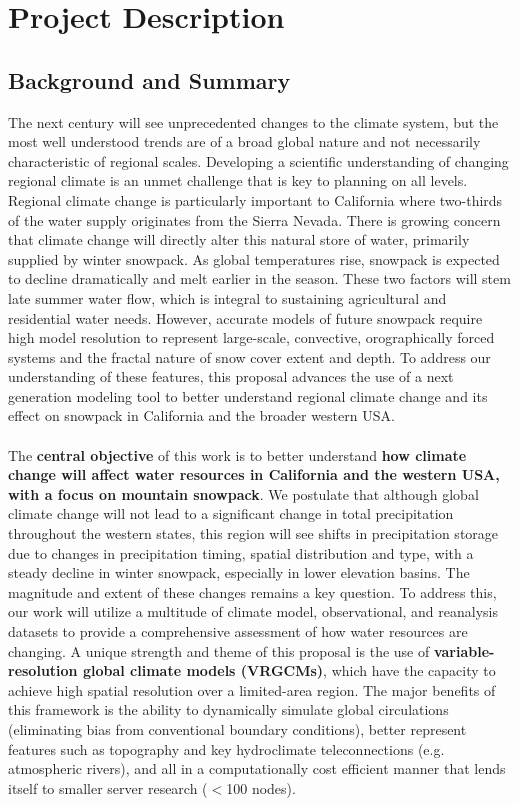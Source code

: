 \documentclass[11pt]{article}
\date{ }
\begin{document}


\section{Project Description}
\subsection{Background and Summary}
The next century will see unprecedented changes to the climate system, but the most well understood trends are of a broad global nature and not necessarily characteristic of regional scales. Developing a scientific understanding of changing regional climate is an unmet challenge that is key to planning on all levels. Regional climate change is particularly important to California where two-thirds of the water supply originates from the Sierra Nevada.  There is growing concern that climate change will directly alter this natural store of water, primarily supplied by  winter snowpack.  As global temperatures rise, snowpack is expected to decline dramatically and melt earlier in the season.  These two factors will stem late summer water flow, which is integral to sustaining agricultural and residential water needs.  However, accurate models of future snowpack require high model resolution to represent large-scale, convective, orographically forced systems and the fractal nature of snow cover extent and depth. To address our understanding of these features, this proposal advances the use of a next generation modeling tool to better understand regional climate change and its effect on snowpack in California and the broader western USA.
\\\\
The \textbf{central objective} of this work is to better understand \textbf{how climate change will affect water resources in California and the western USA, with a focus on mountain snowpack}.  We postulate that although global climate change will not lead to a significant change in total precipitation throughout the western states, this region will see shifts in precipitation storage due to changes in precipitation timing, spatial distribution and type, with a steady decline in winter snowpack, especially in lower elevation basins.  The magnitude and extent of these changes remains a key question.  To address this, our work will utilize a multitude of climate model, observational, and reanalysis datasets to provide a comprehensive assessment of how water resources are changing.  A unique strength and theme of this proposal is the use of \textbf{variable-resolution global climate models (VRGCMs)}, which have the capacity to achieve high spatial resolution over a limited-area region.  The major benefits of this framework is the ability to dynamically simulate global circulations (eliminating bias from conventional boundary conditions), better represent features such as topography and key hydroclimate teleconnections (e.g. atmospheric rivers), and all in a computationally cost efficient manner that lends itself to smaller server research ($<$100 nodes). 
\end{document}
